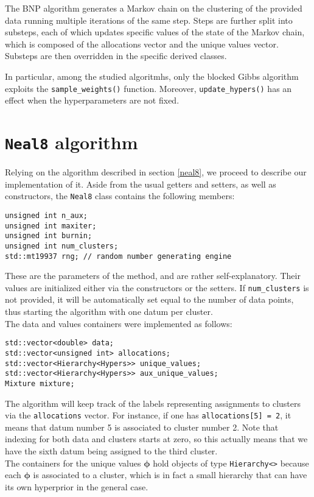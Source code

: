 The BNP algorithm generates a Markov chain on the clustering of the provided data running multiple iterations of the same step.
Steps are further split into substeps, each of which updates specific values of the state of the Markov chain, which is composed of the allocations vector and the unique values vector. Substeps are then overridden in the specific derived classes.


In particular, among the studied algoritmhs, only the blocked Gibbs algorithm exploits the \verb|sample_weights()| function. Moreover, \verb|update_hypers()| has an effect  when the hyperparameters are not fixed.


\section{\texttt{Neal8} algorithm}
Relying on the algorithm described in section \ref{neal8}, we proceed to describe our implementation of it.
Aside from the usual getters and setters, as well as constructors, the \verb|Neal8| class contains the following members:
\begin{verbatim}
unsigned int n_aux;
unsigned int maxiter;
unsigned int burnin;
unsigned int num_clusters;
std::mt19937 rng; // random number generating engine
\end{verbatim}
These are the parameters of the method, and are rather self-explanatory.
Their values are initialized either via the constructors or the setters.
If \verb|num_clusters| is not provided, it will be automatically set equal to the number of data points, thus starting the algorithm with one datum per cluster. \\
The data and values containers were implemented as follows:
\begin{verbatim}
std::vector<double> data;
std::vector<unsigned int> allocations;
std::vector<Hierarchy<Hypers>> unique_values;
std::vector<Hierarchy<Hypers>> aux_unique_values;
Mixture mixture;
\end{verbatim}
The algorithm will keep track of the labels representing assignments to clusters via the \verb|allocations| vector.
For instance, if one has \verb|allocations[5] = 2|, it means that datum number 5 is associated to cluster number 2.
Note that indexing for both data and clusters starts at zero, so this actually means that we have the sixth datum being assigned to the third cluster. \\
The containers for the unique values $\boldsymbol\phi$ hold objects of type \verb|Hierarchy<>| because each $\boldsymbol\phi$ is associated to a cluster, which is in fact a small hierarchy that can have its own hyperprior in the general case.
